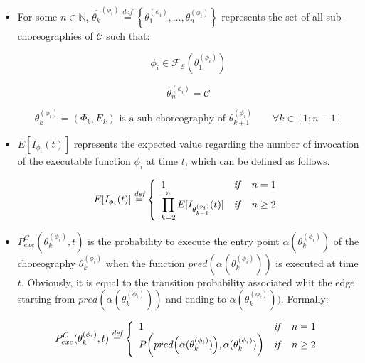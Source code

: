 \documentclass[12pt,a4paper]{report}
\newcommand{\mathDef}{\overset{\textit{def}}{=}}
\newcommand{\N}{\mathbb{N}}
\begin{document}
\begin{itemize}
	\item For some $n \in \N$, $\widehat{\theta_k}^{(\phi_i)} \mathDef \left\{ \theta^{(\phi_i)}_1, \ldots, \theta^{(\phi_i)}_n \right\}$ represents the set of all sub-choreographies of $\mathcal{C}$ such that:
	
	\begin{equation}
		\phi_i \in \mathscr{F_E}(\theta^{(\phi_i)}_1)
	\end{equation}
	
	\begin{equation}
		\theta^{(\phi_i)}_n = \mathcal{C}
	\end{equation}
	
	\begin{equation}
		\theta^{(\phi_i)}_k = (\Phi_k, E_k) \text{ is a sub-choreography of } \theta^{(\phi_i)}_{k+1} \qquad \forall k \in \left[1;n-1\right]
	\end{equation}

	\item $E[I_{\phi_i}(t)]$ represents the expected value regarding the number of invocation of the executable function $\phi_i$ at time $t$, which can be defined as follows.
	
	\begin{equation}	
		E[I_{\phi_i}(t)] \mathDef \left\{
		\begin{array}{lcr}
			1 & \text{\textit{if}} & n = 1 \\ 
			\displaystyle \prod_{k = 2}^n E[I_{\theta_{k-1}^{(\phi_i)}}(t)] & \text{\textit{if}} & n \geq 2 \\
		\end{array} \right.
	\end{equation}
	
	\item $P_{exe}^C(\theta^{(\phi_i)}_k, t)$ is the probability to execute the entry point $\alpha(\theta^{(\phi_i)}_k)$ of the choreography $\theta^{(\phi_i)}_k$ when the function $pred(\alpha(\theta^{(\phi_i)}_k))$ is executed at time $t$. Obviously, it is equal to the transition probability associated whit the edge starting from $pred( \alpha(\theta^{(\phi_i)}_{k}) )$ and ending to $\alpha(\theta^{(\phi_i)}_{k}))$. Formally:
	
	\begin{equation}	
		P_{exe}^C(\theta^{(\phi_i)}_k, t) \mathDef \left\{
		\begin{array}{lcr}
			1 & \text{\textit{if}} & n = 1 \\ 
			P \bigg(  pred\Big( \alpha(\theta^{(\phi_i)}_{k}) \Big), \alpha(\theta^{(\phi_i)}_{k}) \bigg) & \text{\textit{if}} & n \geq 2 \\
		\end{array} \right.
	\end{equation}
	

\end{itemize}
\end{document}
